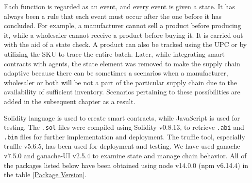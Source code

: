 \vspace{.5cm}

Each function is regarded as an event, and every event is given a state. It has always been a rule that each event must occur after the one before it has concluded. For example, a manufacturer cannot sell a product before producing it, while a wholesaler cannot receive a product before buying it. It is carried out with the aid of a state check. A product can also be tracked using the \ac{UPC} or by utilizing the \ac{SKU} to trace the entire batch. Later, while integrating smart contracts with agents, the state element was removed to make the supply chain adaptive because there can be sometimes a scenarios when a manufacturer, wholesaler or both will be not a part of the particular supply chain due to the availability of sufficient inventory. Scenarios pertaining to these possibilities are added in the subsequent chapter as a result.

\vspace{.5cm}

Solidity language is used to create smart contracts, while JavaScript is used for testing. The \texttt{.sol} files were compiled using Solidity v0.8.13, to retrieve \texttt{.abi} and \texttt{.bin} files for further implementation and deployment. The truffle tool, especially truffle v5.6.5, has been used for deployment and testing. We have used ganache v7.5.0 and ganache-UI v2.5.4 to examine state and manage chain behavior. All of the packages listed below have been obtained using node v14.0.0 (npm v6.14.4) in the table \ref{Package Version}.

\begin{table}[h]
\small
\centering
\caption{Package Version}
\label{Package Version}
\end{table}

